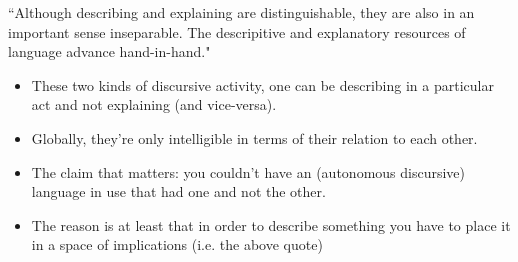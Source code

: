 ``Although describing and explaining are distinguishable, they are also in an
important sense inseparable. The descripitive and explanatory resources of
language advance hand-in-hand."

\begin{itemize}
    \item  These two kinds of discursive activity, one can be describing in a
           particular act and not explaining (and vice-versa).
    \item Globally, they're only intelligible in terms of their relation to
          each other.
    \item The claim that matters: you couldn't have an  (autonomous discursive)
          language in use that had one and not the other.
    \item The reason is at least that in order to describe something you have
          to place it in a space of implications (i.e. the above quote)
\end{itemize}